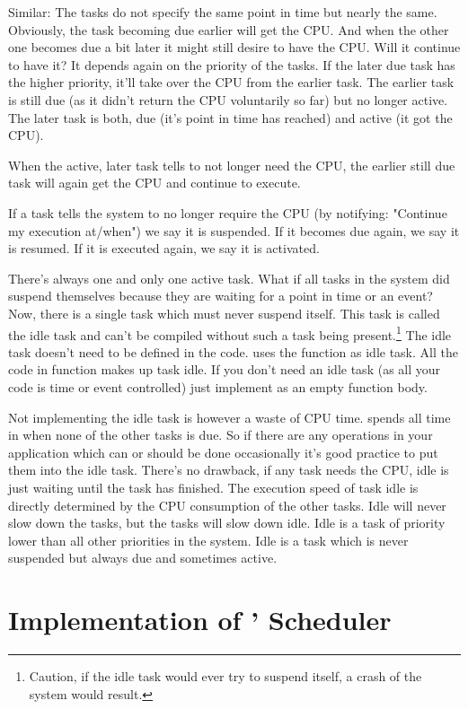 Similar: The tasks do not specify the same point in time but nearly the
same. Obviously, the task becoming due earlier will get the CPU. And when
the other one becomes due a bit later it might still desire to have the
CPU. Will it continue to have it? It depends again on the priority of the
tasks. If the later due task has the higher priority, it'll take over the
CPU from the earlier task. The earlier task is still due (as it didn't
return the CPU voluntarily so far) but no longer active. The later task is
both, due (it's point in time has reached) and active (it got the CPU).

When the active, later task tells \rtos{} to not longer need the CPU, the
earlier still due task will again get the CPU and continue to execute.

If a task tells the system to no longer require the CPU (by notifying:
"Continue my execution at/when") we say it is suspended. If it becomes due
again, we say it is resumed. If it is executed again, we say it is
activated.

There's always one and only one active task. What if all tasks in the
system did suspend themselves because they are waiting for a point in time
or an event? Now, there is a single task which must never suspend itself.
This task is called the idle task and \rtos{} can't be compiled without
such a task being present.\footnote{Caution, if the idle task would ever
try to suspend itself, a crash of the system would result.} The idle task
doesn't need to be defined in the code. \rtos{} uses the function
 as idle task. All the code in function  makes up
task idle. If you don't need an idle task (as all your code is time or
event controlled) just implement  as an empty function body.

Not implementing the idle task is however a waste of CPU time. \rtos{} spends
all time in  when none of the other tasks is due. So if there
are any operations in your application which can or should be done
occasionally it's good practice to put them into the idle task. There's no
drawback, if any task needs the CPU, idle is just waiting until the task
has finished. The execution speed of task idle is directly determined by
the CPU consumption of the other tasks. Idle will never slow down the
tasks, but the tasks will slow down idle. Idle is a task of priority lower
than all other priorities in the system. Idle is a task which is never
suspended but always due and sometimes active.


\section{Implementation of \rtos' Scheduler}
\label{secScheduler}

